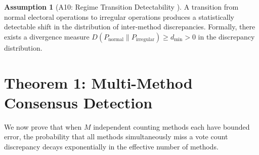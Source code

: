 \documentclass[11pt,a4paper]{article}
\theoremstyle{definition}
\newtheorem{assumption}[theorem]{Assumption}
\begin{document}
\begin{assumption}[A10: Regime Transition Detectability ]
\label{ass:A10}
A transition from normal electoral operations to irregular operations produces a statistically detectable shift in the distribution of inter-method discrepancies. Formally, there exists a divergence measure $D(P_{\text{normal}} \| P_{\text{irregular}}) \geq d_{\min} > 0$ in the discrepancy distribution.
\end{assumption}
\section{Theorem 1: Multi-Method Consensus Detection}
\label{sec:thm1}
We now prove that when $M$ independent counting methods each have bounded error, the probability that all methods simultaneously miss a vote count discrepancy decays exponentially in the effective number of methods.
\end{document}
